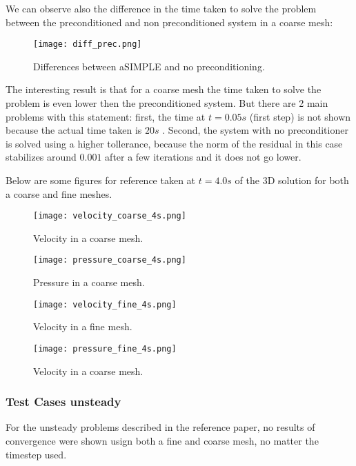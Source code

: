 \documentclass{article}
\begin{document}
We can observe also the difference in the time taken to solve the problem between the preconditioned and non preconditioned system in a coarse mesh:

\begin{figure}[h]
    \centering
    \texttt{[image: diff\_prec.png]}
    \caption{Differences between aSIMPLE and no preconditioning.}
\end{figure}

The interesting result is that for a coarse mesh the time taken to solve the problem is even lower then the preconditioned system. But there are 2 main problems with this statement: first, the time at \(t=0.05s\) (first step) is not shown because the actual time taken is \(20s\) . Second, the system with no preconditioner is solved using a higher tollerance, because the norm of the residual in this case stabilizes around \(0.001\) after a few iterations and it does not go lower.

Below are some figures for reference taken at \(t=4.0s\) of the 3D solution for both a coarse and fine meshes.

\begin{figure}[h]
    \centering
    \texttt{[image: velocity\_coarse\_4s.png]}
    \caption{Velocity in a coarse mesh.}
\end{figure}

\begin{figure}[h]
    \centering
    \texttt{[image: pressure\_coarse\_4s.png]}
    \caption{Pressure in a coarse mesh.}
\end{figure}

\begin{figure}[h]
    \centering
    \texttt{[image: velocity\_fine\_4s.png]}
    \caption{Velocity in a fine mesh.}
\end{figure}

\begin{figure}[h]
    \centering
    \texttt{[image: pressure\_fine\_4s.png]}
    \caption{Velocity in a coarse mesh.}
\end{figure}

\subsubsection{Test Cases unsteady }

For the unsteady problems described in the reference paper, no results of convergence were shown usign both a fine and coarse mesh, no matter the timestep used.
\end{document}
